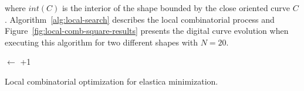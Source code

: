 \documentclass[smallextended]{svjour3}       %
\begin{document}
where $int(C)$ is the interior of the shape bounded by the close oriented curve $C$. Algorithm~\ref{alg:local-search} describes the local combinatorial process and Figure~\ref{fig:local-comb-square-results} presents the digital curve evolution when executing this algorithm for two different shapes with $N=20$.


\begin{algorithm}
 
 \BlankLine
 \Delta $\longleftarrow$ \Tol+1\;
 \label{alg:local-search} 
 \caption{Local combinatorial optimization for elastica minimization.}
\end{algorithm}
\end{document}
